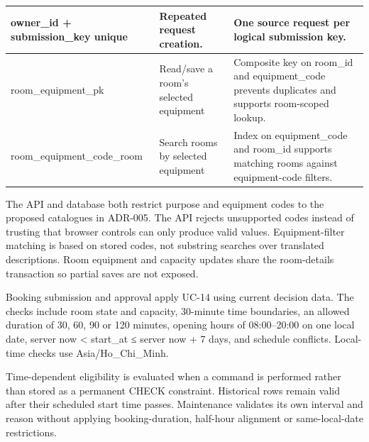 \begin{longtable}{|p{}|p{}|p{}|}
owner\allowbreak\_\allowbreak{}id + submission\allowbreak\_\allowbreak{}key unique & Repeated request creation. & One source request per logical submission key. \\ \hline

room\allowbreak\_\allowbreak{}equipment\allowbreak\_\allowbreak{}pk & Read/\allowbreak{}save a room's selected equipment & Composite key on room\allowbreak\_\allowbreak{}id and equipment\allowbreak\_\allowbreak{}code prevents duplicates and supports room-scoped lookup. \\ \hline

room\allowbreak\_\allowbreak{}equipment\allowbreak\_\allowbreak{}code\allowbreak\_\allowbreak{}room & Search rooms by selected equipment & Index on equipment\allowbreak\_\allowbreak{}code and room\allowbreak\_\allowbreak{}id supports matching rooms against equipment-code filters. \\ \hline

\end{longtable}

\vspace{2mm}

The API and database both restrict purpose and equipment codes to the proposed catalogues in ADR-005. The API rejects unsupported codes instead of trusting that browser controls can only produce valid values. Equipment-filter matching is based on stored codes, not substring searches over translated descriptions. Room equipment and capacity updates share the room-details transaction so partial saves are not exposed.\par

Booking submission and approval apply UC-14 using current decision data. The checks include room state and capacity, 30-minute time boundaries, an allowed duration of 30, 60, 90 or 120 minutes, opening hours of 08:00–20:00 on one local date, server now < start\allowbreak\_\allowbreak{}at ≤ server now + 7 days, and schedule conflicts. Local-time checks use Asia/\allowbreak{}Ho\allowbreak\_\allowbreak{}Chi\allowbreak\_\allowbreak{}Minh.\par

Time-dependent eligibility is evaluated when a command is performed rather than stored as a permanent CHECK constraint. Historical rows remain valid after their scheduled start time passes. Maintenance validates its own interval and reason without applying booking-duration, half-hour alignment or same-local-date restrictions.\par

